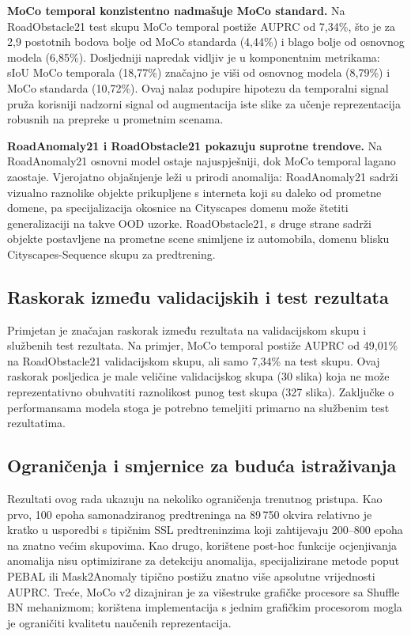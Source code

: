 \documentclass[diplomskirad]{fer}
\begin{document}
\textbf{MoCo temporal konzistentno nadmašuje MoCo standard.}
Na RoadObstacle21 test skupu MoCo temporal postiže AUPRC od
7{,}34\%, što je za 2{,}9 postotnih bodova bolje od MoCo standarda
(4{,}44\%) i blago bolje od osnovnog modela (6{,}85\%). Dosljedniji
napredak vidljiv je u komponentnim metrikama: sIoU MoCo temporala
(18{,}77\%) značajno je viši od osnovnog modela (8{,}79\%) i MoCo
standarda (10{,}72\%). Ovaj nalaz podupire hipotezu da temporalni
signal pruža korisniji nadzorni signal od augmentacija iste slike
za učenje reprezentacija robusnih na prepreke u prometnim scenama.

\textbf{RoadAnomaly21 i RoadObstacle21 pokazuju suprotne trendove.}
Na RoadAnomaly21 osnovni model ostaje najuspješniji, dok MoCo
temporal lagano zaostaje. Vjerojatno objašnjenje leži u prirodi
anomalija: RoadAnomaly21 sadrži vizualno raznolike objekte
prikupljene s interneta koji su daleko od prometne domene, pa
specijalizacija okosnice na Cityscapes domenu može štetiti
generalizaciji na takve OOD uzorke. RoadObstacle21, s druge strane
sadrži objekte postavljene na prometne scene snimljene iz automobila, domenu blisku Cityscapes-Sequence skupu za predtrening.

\subsection{Raskorak između validacijskih i test rezultata}

Primjetan je značajan raskorak između rezultata na validacijskom
skupu i službenih test rezultata. Na primjer, MoCo temporal postiže
AUPRC od 49{,}01\% na RoadObstacle21 validacijskom skupu, ali samo
7{,}34\% na test skupu. Ovaj raskorak posljedica je male veličine
validacijskog skupa (30 slika) koja ne može reprezentativno
obuhvatiti raznolikost punog test skupa (327 slika). Zaključke o
performansama modela stoga je potrebno temeljiti primarno na
službenim test rezultatima.

\subsection{Ograničenja i smjernice za buduća istraživanja}

Rezultati ovog rada ukazuju na nekoliko ograničenja trenutnog
pristupa. Kao prvo, 100 epoha samonadziranog predtreninga na
89\,750 okvira relativno je kratko u usporedbi s tipičnim SSL
predtreninzima koji zahtijevaju 200--800 epoha na znatno većim
skupovima. Kao drugo, korištene post-hoc funkcije ocjenjivanja
anomalija nisu optimizirane za detekciju anomalija, specijalizirane
metode poput PEBAL ili Mask2Anomaly tipično postižu znatno više
apsolutne vrijednosti AUPRC. Treće, MoCo v2 dizajniran je za
višestruke grafičke procesore sa Shuffle BN mehanizmom; korištena
implementacija s jednim grafičkim procesorom mogla je ograničiti
kvalitetu naučenih reprezentacija.
\end{document}
